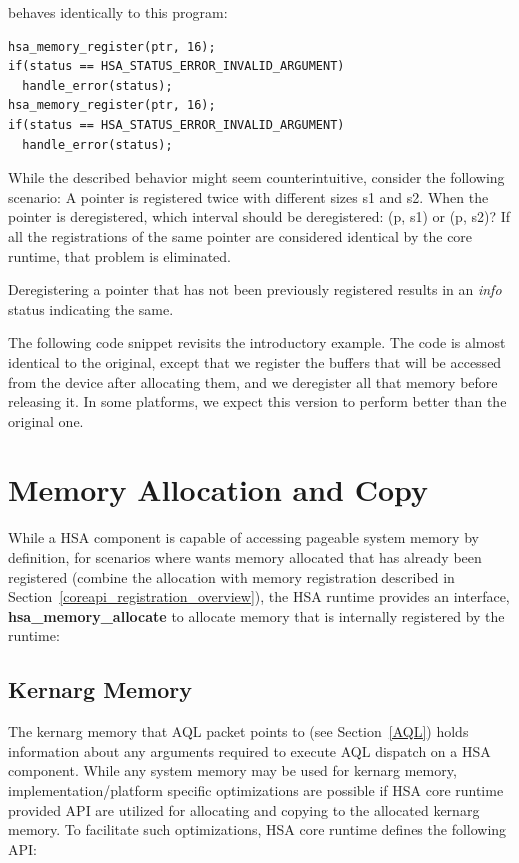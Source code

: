 \documentclass{book}
\newcommand{\reffun}[1]{\textbf{#1}}
\begin{document}
behaves identically to this program:

\begin{lstlisting}
hsa_memory_register(ptr, 16);
if(status == HSA_STATUS_ERROR_INVALID_ARGUMENT)
  handle_error(status);
hsa_memory_register(ptr, 16);
if(status == HSA_STATUS_ERROR_INVALID_ARGUMENT)
  handle_error(status);
\end{lstlisting}

While the described behavior might seem counterintuitive, consider
the following scenario: A pointer is registered twice with
different sizes s1 and s2. When the pointer is deregistered, which
interval should be deregistered: (p, s1) or (p, s2)? If all the
registrations of the same pointer are considered identical by the
core runtime, that problem is eliminated.

Deregistering a pointer that has not been previously registered
results in an \emph{info} status indicating the same.

The following code snippet revisits the introductory example. The
code is almost identical to the original, except that we register
the buffers that will be accessed from the device after allocating
them, and we deregister all that memory before releasing it. In some
platforms, we expect this version to perform better than the
original one.


\hypertarget{coreapi_device_memory}{}\section{Memory Allocation
and Copy}\label{coreapi_device_memory}

While a HSA component is capable of accessing pageable system memory
by definition, for scenarios where wants memory allocated that has
already been registered (combine the allocation with memory
registration described in
Section~\ref{coreapi_registration_overview}), the HSA runtime
provides an interface, \reffun{hsa\_memory\_allocate} to allocate
memory that is internally registered by the runtime:



\hypertarget{coreapi_kernarg}{}\subsection{Kernarg
Memory}\label{kernargmem}

The kernarg memory that AQL packet points to (see Section~\ref{AQL})
holds information about any arguments required to execute AQL dispatch
on a HSA component. While any system memory may be used for kernarg
memory, implementation/platform specific optimizations are possible if
HSA core runtime provided API are utilized for allocating and copying
to the allocated kernarg memory. To facilitate such optimizations, HSA
core runtime defines the following API:
\end{document}
